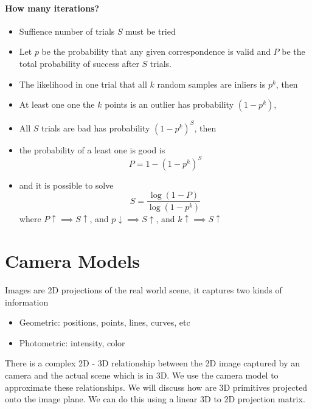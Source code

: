 \documentclass[11pt]{article}
\begin{document}
\paragraph{How many iterations?}  
\begin{itemize}
	\item Suffience number of trials $S$ must be tried
	\item Let $p$ be the probability that any given correspondence is valid and $P$ be the total probability of success after $S$ trials. 
	\item The likelihood in one trial that all $k$ random samples are inliers is $p^k$, then
	\item At least one one the $k$ points is an outlier has probability $(1 - p^k)$,
	\item All $S$ trials are bad has probability $(1 - p^k)^S$, then
	\item the probability of a least one is good is
		\begin{equation}
			P = 1 - (1 - p^k)^S
		\end{equation}
	\item and it is possible to solve 
		\begin{equation}
			S = \frac{\log (1 - P)}{\log (1 - p^k)} 
		\end{equation}
		where $P \uparrow \implies S\uparrow$, and $p\downarrow \implies S\uparrow$, and $k \uparrow \implies S\uparrow$
\end{itemize}


\section{Camera Models}
Images are 2D projections of the real world scene, it captures two kinds of information
\begin{itemize}
	\item Geometric: positions, points, lines, curves, etc
	\item Photometric: intensity, color
\end{itemize}
There is a complex 2D - 3D relationship between the 2D image captured by an camera and the actual scene which is in 3D. We use the camera model to approximate these relationships. We will discuss how are 3D primitives projected onto the image plane. We can do this using a linear 3D to 2D projection matrix. 
\end{document}
